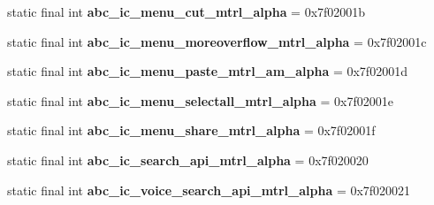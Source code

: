 \begin{DoxyCompactItemize}
\item 
\hypertarget{classandroid_1_1support_1_1design_1_1_r_1_1drawable_a57f5209b3da1abe79340d6f761c086fe}{}static final int {\bfseries abc\+\_\+ic\+\_\+menu\+\_\+cut\+\_\+mtrl\+\_\+alpha} = 0x7f02001b\label{classandroid_1_1support_1_1design_1_1_r_1_1drawable_a57f5209b3da1abe79340d6f761c086fe}

\item 
\hypertarget{classandroid_1_1support_1_1design_1_1_r_1_1drawable_a5dd66f79cb0c9637e2cd7c52d7cf8b2e}{}static final int {\bfseries abc\+\_\+ic\+\_\+menu\+\_\+moreoverflow\+\_\+mtrl\+\_\+alpha} = 0x7f02001c\label{classandroid_1_1support_1_1design_1_1_r_1_1drawable_a5dd66f79cb0c9637e2cd7c52d7cf8b2e}

\item 
\hypertarget{classandroid_1_1support_1_1design_1_1_r_1_1drawable_a4e6ea049511edc786da2401ea1af7aa6}{}static final int {\bfseries abc\+\_\+ic\+\_\+menu\+\_\+paste\+\_\+mtrl\+\_\+am\+\_\+alpha} = 0x7f02001d\label{classandroid_1_1support_1_1design_1_1_r_1_1drawable_a4e6ea049511edc786da2401ea1af7aa6}

\item 
\hypertarget{classandroid_1_1support_1_1design_1_1_r_1_1drawable_af61cd59ede2a2d0c843a247123154674}{}static final int {\bfseries abc\+\_\+ic\+\_\+menu\+\_\+selectall\+\_\+mtrl\+\_\+alpha} = 0x7f02001e\label{classandroid_1_1support_1_1design_1_1_r_1_1drawable_af61cd59ede2a2d0c843a247123154674}

\item 
\hypertarget{classandroid_1_1support_1_1design_1_1_r_1_1drawable_a63c9c5f3b9f430077d1b7fb19e37b279}{}static final int {\bfseries abc\+\_\+ic\+\_\+menu\+\_\+share\+\_\+mtrl\+\_\+alpha} = 0x7f02001f\label{classandroid_1_1support_1_1design_1_1_r_1_1drawable_a63c9c5f3b9f430077d1b7fb19e37b279}

\item 
\hypertarget{classandroid_1_1support_1_1design_1_1_r_1_1drawable_afa56b0f0f99e441c75def3968b35d6d9}{}static final int {\bfseries abc\+\_\+ic\+\_\+search\+\_\+api\+\_\+mtrl\+\_\+alpha} = 0x7f020020\label{classandroid_1_1support_1_1design_1_1_r_1_1drawable_afa56b0f0f99e441c75def3968b35d6d9}

\item 
\hypertarget{classandroid_1_1support_1_1design_1_1_r_1_1drawable_a56cc5c5c25f0c861446820304465a343}{}static final int {\bfseries abc\+\_\+ic\+\_\+voice\+\_\+search\+\_\+api\+\_\+mtrl\+\_\+alpha} = 0x7f020021\label{classandroid_1_1support_1_1design_1_1_r_1_1drawable_a56cc5c5c25f0c861446820304465a343}


\end{DoxyCompactItemize}
